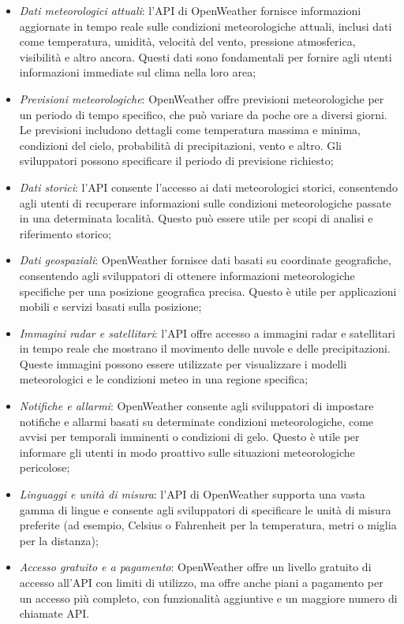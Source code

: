 \begin{itemize}
    \item \textit{Dati meteorologici attuali}: l'API di OpenWeather fornisce informazioni aggiornate in tempo reale sulle condizioni meteorologiche attuali, inclusi dati come temperatura, umidità, velocità del vento, pressione atmosferica, visibilità e altro ancora. Questi dati sono fondamentali per fornire agli utenti informazioni immediate sul clima nella loro area; 
    \item \textit{Previsioni meteorologiche}: OpenWeather offre previsioni meteorologiche per un periodo di tempo specifico, che può variare da poche ore a diversi giorni. Le previsioni includono dettagli come temperatura massima e minima, condizioni del cielo, probabilità di precipitazioni, vento e altro. Gli sviluppatori possono specificare il periodo di previsione richiesto; 
    \item \textit{Dati storici}: l'API consente l'accesso ai dati meteorologici storici, consentendo agli utenti di recuperare informazioni sulle condizioni meteorologiche passate in una determinata località. Questo può essere utile per scopi di analisi e riferimento storico; 
    \item \textit{Dati geospaziali}: OpenWeather fornisce dati basati su coordinate geografiche, consentendo agli sviluppatori di ottenere informazioni meteorologiche specifiche per una posizione geografica precisa. Questo è utile per applicazioni mobili e servizi basati sulla posizione; 
    \item \textit{Immagini radar e satellitari}: l'API offre accesso a immagini radar e satellitari in tempo reale che mostrano il movimento delle nuvole e delle precipitazioni. Queste immagini possono essere utilizzate per visualizzare i modelli meteorologici e le condizioni meteo in una regione specifica; 
    \item \textit{Notifiche e allarmi}: OpenWeather consente agli sviluppatori di impostare notifiche e allarmi basati su determinate condizioni meteorologiche, come avvisi per temporali imminenti o condizioni di gelo. Questo è utile per informare gli utenti in modo proattivo sulle situazioni meteorologiche pericolose; 
    \item \textit{Linguaggi e unità di misura}: l'API di OpenWeather supporta una vasta gamma di lingue e consente agli sviluppatori di specificare le unità di misura preferite (ad esempio, Celsius o Fahrenheit per la temperatura, metri o miglia per la distanza); 
    \item \textit{Accesso gratuito e a pagamento}: OpenWeather offre un livello gratuito di accesso all'API con limiti di utilizzo, ma offre anche piani a pagamento per un accesso più completo, con funzionalità aggiuntive e un maggiore numero di chiamate API.
\end{itemize}

